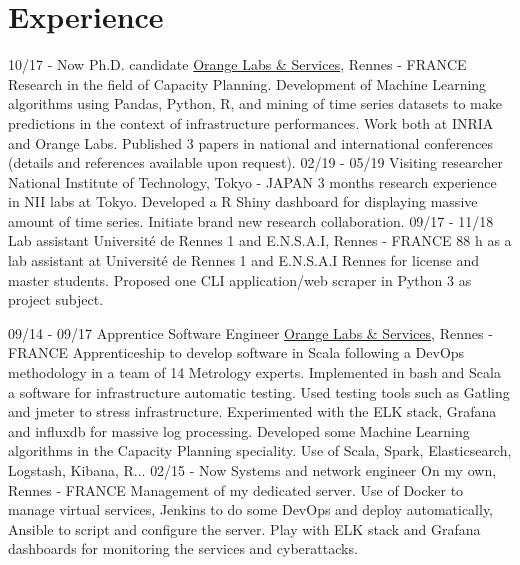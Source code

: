 \documentclass[]{friggeri-cv}
\begin{document}
\section{Experience}
\begin{entrylist}
  \entry
    {10/17 - Now}
    {Ph.D. candidate}
    {\href{http://www.orange.com/en/home}{Orange Labs \& Services}, Rennes - FRANCE}
    {Research in the field of Capacity Planning. 
    Development of Machine Learning algorithms using Pandas, Python, R, and mining of time series datasets to make predictions in the context of infrastructure performances. 
    Work both at INRIA and Orange Labs. 
    Published 3 papers in national and international conferences (details and references available upon request).
    }
  \entry
    {02/19 - 05/19}
    {Visiting researcher}
    {National Institute of Technology, Tokyo - JAPAN}
    {3 months research experience in NII labs at Tokyo. 
    Developed a R Shiny dashboard for displaying massive amount of time series.
    Initiate brand new research collaboration. 
    }
        \vspace{-1.1em}
  \entry
    {09/17 - 11/18}
    {Lab assistant}
    {Université de Rennes 1 and E.N.S.A.I, Rennes - FRANCE}
    {88 h as a lab assistant at Université de Rennes 1 and E.N.S.A.I Rennes for license and master students. 
    Proposed one CLI application/web scraper in Python 3 as project subject.
    }

  \entry
    {09/14 - 09/17}
    {Apprentice Software Engineer}
    {\href{http://www.orange.com/en/home}{Orange Labs \& Services}, Rennes - FRANCE}
    {Apprenticeship to develop software in Scala following a DevOps methodology in a team of 14 Metrology experts. %
    Implemented in bash and Scala a software for infrastructure automatic testing. 
    Used testing tools such as Gatling and jmeter to stress infrastructure.    
    Experimented with the ELK stack, Grafana and influxdb for massive log processing.
    Developed some Machine Learning algorithms in the Capacity Planning speciality.     
	Use of Scala, Spark, Elasticsearch, Logstash, Kibana, R...
}
  \entry
    {02/15 - Now}
    {Systems and network engineer}
    {On my own, Rennes - FRANCE}
    {Management of my dedicated server. 
    Use of Docker to manage virtual services, Jenkins to do some DevOps and deploy automatically, Ansible to script and configure the server. Play with ELK stack and Grafana dashboards for monitoring the services and cyberattacks.}
\end{entrylist}
\end{document}
